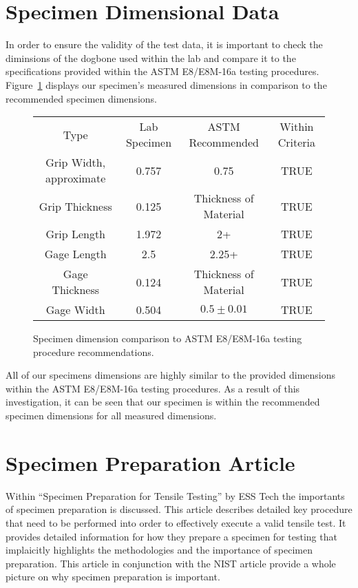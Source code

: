 \documentclass{article}
\begin{document}
\section{Specimen Dimensional Data}
In order to ensure the validity of the test data, it is important to check the diminsions of the dogbone used within the lab and compare it to the specifications provided within the ASTM E8/E8M-16a testing procedures. Figure~\ref{tab:SpecimenDimensions} displays our specimen's measured dimensions in comparison to the recommended specimen dimensions.

\begin{figure}[H]
\begin{center}
\begin{tabular}{|c|c|c|c|}
\hline
Type & Lab Specimen & ASTM Recommended & Within Criteria\\
Grip Width, approximate & 0.757 & 0.75 & TRUE \\
Grip Thickness & 0.125 & Thickness of Material & TRUE \\
Grip Length & 1.972 & 2+ & TRUE \\
Gage Length & 2.5 & 2.25+ & TRUE \\
Gage Thickness & 0.124 & Thickness of Material & TRUE \\
Gage Width & 0.504 & $0.5 \pm 0.01$ & TRUE \\
\hline
\end{tabular}
\caption{Specimen dimension comparison to ASTM E8/E8M-16a testing procedure recommendations.}
\label{tab:SpecimenDimensions}
\end{center}
\end{figure}

All of our specimens dimensions are highly similar to the provided dimensions within the ASTM E8/E8M-16a testing procedures. As a result of this investigation, it can be seen that our specimen is within the recommended specimen dimensions for all measured dimensions.

\section{Specimen Preparation Article}

Within ``Specimen Preparation for Tensile Testing'' by ESS Tech the importants of specimen preparation is discussed. This article describes detailed key procedure that need to be performed into order to effectively execute a valid tensile test. It provides detailed information for how they prepare a specimen for testing that implaicitly highlights the methodologies and the importance of specimen preparation. This article in conjunction with the NIST article provide a whole picture on why specimen preparation is important.
\end{document}
